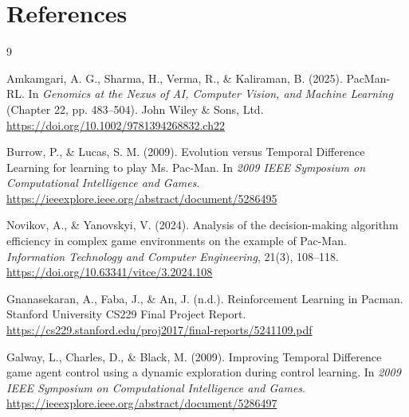 \documentclass{article}
\begin{document}
\section{References}
\begin{thebibliography}{9}

Amkamgari, A. G., Sharma, H., Verma, R., \& Kaliraman, B. (2025).
\newblock PacMan-RL.
\newblock In \emph{Genomics at the Nexus of AI, Computer Vision, and Machine Learning} (Chapter 22, pp. 483--504).
\newblock John Wiley \& Sons, Ltd.
\newblock \url{https://doi.org/10.1002/9781394268832.ch22}

Burrow, P., \& Lucas, S. M. (2009).
\newblock Evolution versus Temporal Difference Learning for learning to play Ms. Pac-Man.
\newblock In \emph{2009 IEEE Symposium on Computational Intelligence and Games}.
\newblock \url{https://ieeexplore.ieee.org/abstract/document/5286495}

Novikov, A., \& Yanovskyi, V. (2024).
\newblock Analysis of the decision-making algorithm efficiency in complex game environments on the example of Pac-Man.
\newblock \emph{Information Technology and Computer Engineering}, 21(3), 108--118.
\newblock \url{https://doi.org/10.63341/vitce/3.2024.108}

Gnanasekaran, A., Faba, J., \& An, J. (n.d.).
\newblock Reinforcement Learning in Pacman.
\newblock Stanford University CS229 Final Project Report.
\newblock \url{https://cs229.stanford.edu/proj2017/final-reports/5241109.pdf}

Galway, L., Charles, D., \& Black, M. (2009).
\newblock Improving Temporal Difference game agent control using a dynamic exploration during control learning.
\newblock In \emph{2009 IEEE Symposium on Computational Intelligence and Games}.
\newblock \url{https://ieeexplore.ieee.org/abstract/document/5286497}

\end{thebibliography}
\fi
\end{document}
